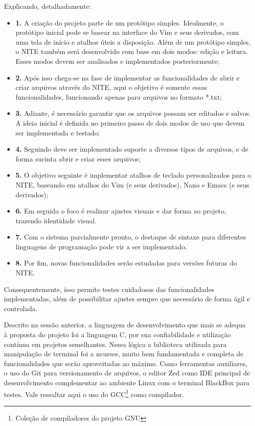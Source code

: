 Explicando, detalhadamente:

\begin{itemize}
    \item \textbf{1.} A criação do projeto parte de um protótipo simples. Idealmente, o protótipo inicial pode se basear na interface do Vim e seus derivados, com uma tela de início e atalhos úteis a disposição. Além de um protótipo simples, o NITE também será desenvolvido com base em dois modos: edição e leitura. Esses modos devem ser analisados e implementados posteriormente;

    \item \textbf{2.} Após isso chega-se na fase de implementar as funcionalidades de abrir e criar arquivos através do NITE, aqui o objetivo é somente essas funcionalidades, funcionando apenas para arquivos no formato *.txt;

    \item \textbf{3.} Adiante, é necessário garantir que os arquivos possam ser editados e salvos. A ideia inicial é definida no primeiro passo de dois modos de uso que devem ser implementada e testado;

    \item \textbf{4.} Seguindo deve ser implementado suporte a diversos tipos de arquivos, e de forma sucinta abrir e criar esses arquivos;

    \item \textbf{5.} O objetivo seguinte é implementar atalhos de teclado personalizados para o NITE, baseando em atalhos do Vim (e seus derivados), Nano e Emacs (e seus derivados);

    \item \textbf{6.} Em seguida o foco é realizar ajustes visuais e dar forma ao projeto, trazendo identidade visual.

    \item \textbf{7.} Com o sistema parcialmente pronto, o destaque de sintaxe para diferentes linguagens de programação pode vir a ser implementado.

    \item \textbf{8.} Por fim, novas funcionalidades serão estudadas para versões futuras do NITE.
\end{itemize}

Consequentemente, isso permite testes cuidadosos das funcionalidades implementadas, além de possibilitar ajustes sempre que necessário de forma ágil e controlada.

Descrito na sessão anterior, a linguagem de desenvolvimento que mais se adequa à proposta do projeto foi a linguagem C, por sua confiabilidade e utilização contínua em projetos semelhantes. Nessa lógica a biblioteca utilizada para manipulação de terminal foi a ncurses, muito bem fundamentada e completa de funcionalidades que serão aproveitadas ao máximo. Como ferramentas auxiliares, o uso do Git para versionamento de arquivos, o editor Zed como IDE principal de desenvolvimento complementar ao ambiente Linux com o terminal BlackBox para testes. Vale ressaltar aqui o uso do GCC\footnote{Coleção de compiladores do projeto GNU} como compilador.